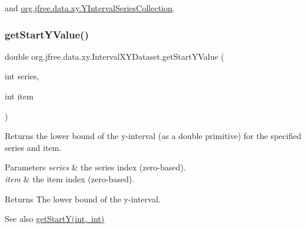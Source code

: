 and \mbox{\hyperlink{classorg_1_1jfree_1_1data_1_1xy_1_1_y_interval_series_collection_af499ea43862281841b964053bc9950dc}{org.\+jfree.\+data.\+xy.\+Y\+Interval\+Series\+Collection}}.

\mbox{\label{interfaceorg_1_1jfree_1_1data_1_1xy_1_1_interval_x_y_dataset_aed1acf6e36561ce5acc3f6811a2ecef9}} 
\subsubsection{\texorpdfstring{get\+Start\+Y\+Value()}{getStartYValue()}}
{\footnotesize\ttfamily double org.\+jfree.\+data.\+xy.\+Interval\+X\+Y\+Dataset.\+get\+Start\+Y\+Value (\begin{DoxyParamCaption}\item[{int}]{series,  }\item[{int}]{item }\end{DoxyParamCaption})}

Returns the lower bound of the y-\/interval (as a double primitive) for the specified series and item.


\begin{DoxyParams}{Parameters}
{\em series} & the series index (zero-\/based). \\
\hline
{\em item} & the item index (zero-\/based).\\
\hline
\end{DoxyParams}
\begin{DoxyReturn}{Returns}
The lower bound of the y-\/interval.
\end{DoxyReturn}
\begin{DoxySeeAlso}{See also}
\mbox{\hyperlink{interfaceorg_1_1jfree_1_1data_1_1xy_1_1_interval_x_y_dataset_afdd414735adb233734bc35b76a005ed9}{get\+Start\+Y(int, int)}} 
\end{DoxySeeAlso}


